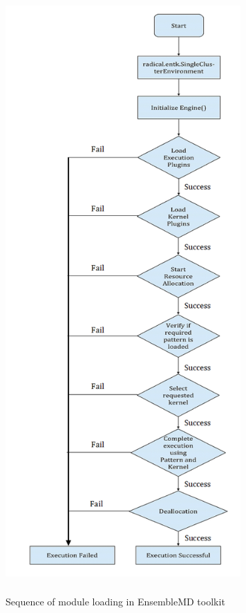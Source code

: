 \documentclass[10pt]{ruthesis}
\begin{document}
\begin{figure}
  \centering
  \includegraphics[width=9cm,height=23cm]{ex_flow.png}
  \caption{Sequence of module loading in EnsembleMD toolkit}
  \label{fig:modulesofenmd}
\end{figure}
\end{document}
